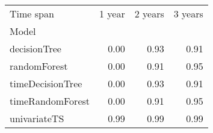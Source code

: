 \begin{tabular}{lrrr}
\toprule
Time span & 1 year & 2 years & 3 years \\
Model &  &  &  \\
\midrule
decisionTree & 0.00 & 0.93 & 0.91 \\
randomForest & 0.00 & 0.91 & 0.95 \\
timeDecisionTree & 0.00 & 0.93 & 0.91 \\
timeRandomForest & 0.00 & 0.91 & 0.95 \\
univariateTS & 0.99 & 0.99 & 0.99 \\
\bottomrule
\end{tabular}

